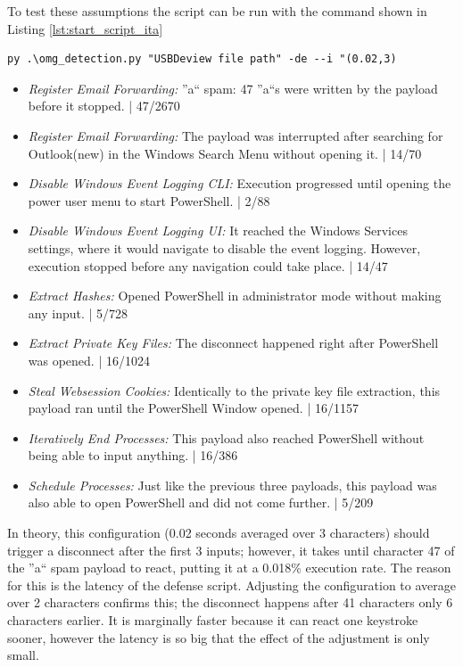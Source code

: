 To test these assumptions the script can be run with the command shown in Listing \ref{lst:start_script_ita}


\begin{lstlisting}[caption={start Defense Script with ITA (0.02,3)},label={lst:start_script_ita}, captionpos=b]
 py .\omg_detection.py "USBDeview file path" -de --i "(0.02,3)
\end{lstlisting}

\begin{itemize}
    \item  \emph{Register Email Forwarding:} {''a`` spam}: 47 ''a``s were written by the payload before it stopped. | 47/2670
    \item  \emph{Register Email Forwarding:} The payload was interrupted after searching for Outlook(new) in the Windows Search Menu without opening it.  | 14/70 
    \item  \emph{Disable Windows Event Logging CLI:} Execution progressed until opening the power user menu to start PowerShell. | 2/88
    \item  \emph{Disable Windows Event Logging UI:} It reached the Windows Services settings, where it would navigate to disable the event logging. However, execution stopped before any navigation could take place.  | 14/47
    \item  \emph{Extract Hashes:} Opened PowerShell in administrator mode without making any input. | 5/728 
    \item  \emph{Extract Private Key Files:} The disconnect happened right after PowerShell was opened. | 16/1024
    \item  \emph{Steal Websession Cookies:} Identically to the private key file extraction, this payload ran until the PowerShell Window opened. | 16/1157
    \item  \emph{Iteratively End Processes:} This payload also reached PowerShell without being able to input anything. | 16/386
    \item  \emph{Schedule Processes:} Just like the previous three payloads, this payload was also able to open PowerShell and did not come further. | 5/209
\end{itemize}

In theory, this configuration (0.02 seconds averaged over 3 characters) should trigger a disconnect after the first 3 inputs; however, it takes until character 47 of the ''a`` spam payload to react, putting it at a 0.018\% execution rate. The reason for this is the latency of the defense script. Adjusting the configuration to average over 2 characters confirms this; the disconnect happens after 41 characters only 6 characters earlier. It is marginally faster because it can react one keystroke sooner, however the latency is so big that the effect of the adjustment is only small.

